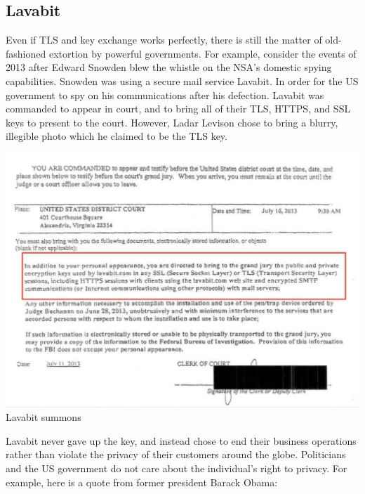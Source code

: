 \documentclass[11pt]{article} %
\begin{document}
{\subsection{Lavabit}
Even if TLS and key exchange works perfectly, there is still the matter of old-fashioned extortion by powerful governments. For example, consider the events of 2013 after Edward Snowden blew the whistle on the NSA's domestic spying capabilities.
Snowden was using a secure mail service Lavabit. In order for the US government to spy on his communications after his defection. Lavabit was commanded to appear in court, and to bring all of their TLS, HTTPS, and SSL keys to present to the court. However, Ladar Levison chose to bring a blurry, illegible photo which he claimed to be the TLS key.
\begin{center}
\includegraphics[scale=.3]{./lavabit-summons.png}
\\Lavabit summons
\end{center}

Lavabit never gave up the key, and instead chose to end their business operations rather than violate the privacy of their customers around the globe. Politicians and the US government do not care about the individual's right to privacy. For example, here is a quote from former president Barack Obama:

}
\end{document}
